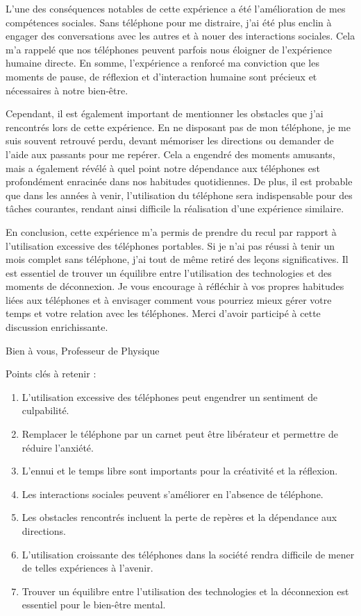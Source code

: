 \documentclass[a4paper, 10pt, garamond]{book}
\begin{document}
L'une des conséquences notables de cette expérience a été l'amélioration de mes
compétences sociales. Sans téléphone pour me distraire, j'ai été plus enclin à
engager des conversations avec les autres et à nouer des interactions sociales.
Cela m'a rappelé que nos téléphones peuvent parfois nous éloigner de
l'expérience humaine directe. En somme, l'expérience a renforcé ma conviction
que les moments de pause, de réflexion et d'interaction humaine sont précieux et
nécessaires à notre bien-être.

Cependant, il est également important de mentionner les obstacles que j'ai
rencontrés lors de cette expérience. En ne disposant pas de mon téléphone, je me
suis souvent retrouvé perdu, devant mémoriser les directions ou demander de
l'aide aux passants pour me repérer. Cela a engendré des moments amusants, mais
a également révélé à quel point notre dépendance aux téléphones est profondément
enracinée dans nos habitudes quotidiennes. De plus, il est probable que dans les
années à venir, l'utilisation du téléphone sera indispensable pour des tâches
courantes, rendant ainsi difficile la réalisation d'une expérience similaire.

En conclusion, cette expérience m'a permis de prendre du recul par rapport à
l'utilisation excessive des téléphones portables. Si je n'ai pas réussi à tenir
un mois complet sans téléphone, j'ai tout de même retiré des leçons
significatives. Il est essentiel de trouver un équilibre entre l'utilisation des
technologies et des moments de déconnexion. Je vous encourage à réfléchir à vos
propres habitudes liées aux téléphones et à envisager comment vous pourriez
mieux gérer votre temps et votre relation avec les téléphones. Merci d'avoir
participé à cette discussion enrichissante.

Bien à vous,
Professeur de Physique

Points clés à retenir :
\begin{enumerate}
	\item L'utilisation excessive des téléphones peut engendrer un sentiment de
	      culpabilité.
	\item Remplacer le téléphone par un carnet peut être libérateur et permettre de réduire l'anxiété.
	\item L'ennui et le temps libre sont importants pour la créativité et la
	      réflexion.
	\item Les interactions sociales peuvent s'améliorer en l'absence de téléphone.
	\item Les obstacles rencontrés incluent la perte de repères et la dépendance
	      aux directions.
	\item L'utilisation croissante des téléphones dans la société rendra difficile
	      de mener de telles expériences à l'avenir.
	\item Trouver un équilibre entre l'utilisation des technologies et la
	      déconnexion est essentiel pour le bien-être mental.
\end{enumerate}
\end{document}
